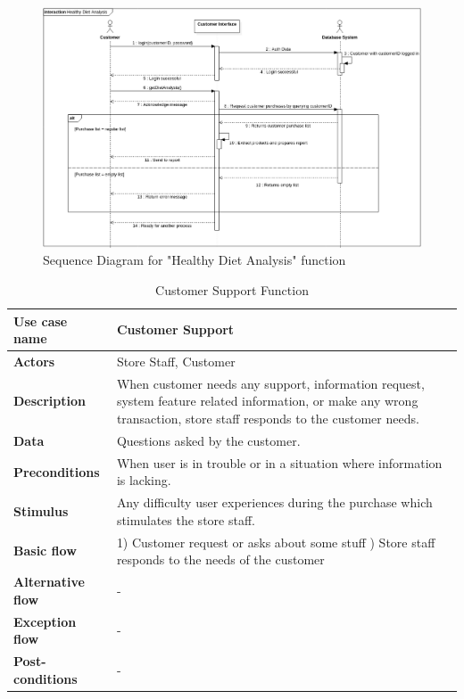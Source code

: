 \begin{figure}[H]
    \centering
    \includegraphics[width=0.99\linewidth]{content/specificRequirements/img/SequenceDiagramHealthyDietAnalysis.png}
    \caption{Sequence Diagram for "Healthy Diet Analysis" function}
    \label{fig:seq_diagram_healthy_diet}
\end{figure}

\begin{table}[H]
    \centering
    \begin{tabular}{ | l | p{10cm} |}
    \hline
    \textbf{Use case name}    & Customer Support \\
    \hline
    \textbf{Actors}           & Store Staff, Customer \\
    \hline
    \textbf{Description}      & When customer needs any support, information request, system feature related information, or make any wrong transaction, store staff responds to the customer needs.  \\
    \hline
    \textbf{Data}             & Questions asked by the customer. \\
    \hline
    \textbf{Preconditions}    & When user is in trouble or in a situation where information is lacking. \\
    \hline
    \textbf{Stimulus}         & Any difficulty user experiences during the purchase which stimulates the store staff. \\
    \hline
    \textbf{Basic flow}       & 1) Customer request or asks about some stuff \newline 2) Store staff responds to the needs of the customer \\
    \hline
    \textbf{Alternative flow} & - \\
    \hline
    \textbf{Exception flow}   & - \\
    \hline
    \textbf{Post-conditions}  & - \\
    \hline
    \end{tabular}
    \caption{Customer Support Function}
    \label{tab:02customer_support}
\end{table}


